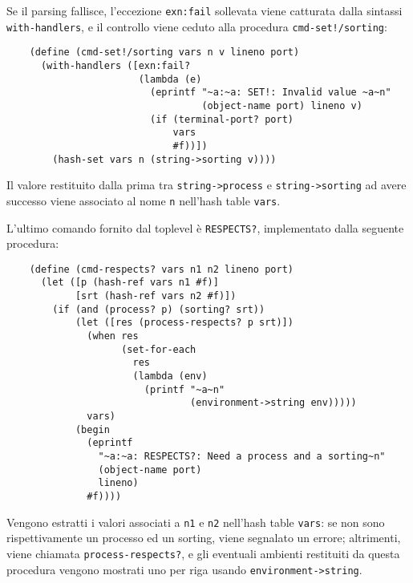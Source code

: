 Se il parsing fallisce, l'eccezione \lstinline{exn:fail} sollevata
viene catturata dalla sintassi \lstinline{with-handlers}, e il controllo
viene ceduto alla procedura \lstinline{cmd-set!/sorting}:

\begin{lstlisting}
    (define (cmd-set!/sorting vars n v lineno port)
      (with-handlers ([exn:fail?
                       (lambda (e)
                         (eprintf "~a:~a: SET!: Invalid value ~a~n"
                                  (object-name port) lineno v)
                         (if (terminal-port? port)
                             vars
                             #f))])
        (hash-set vars n (string->sorting v))))
\end{lstlisting}

Il valore restituito dalla prima tra \lstinline{string->process} e
\lstinline{string->sorting} ad avere successo viene associato al nome
\lstinline{n} nell'hash table \lstinline{vars}.

L'ultimo comando fornito dal toplevel \`e \lstinline{RESPECTS?},
implementato dalla seguente procedura:

\begin{lstlisting}
    (define (cmd-respects? vars n1 n2 lineno port)
      (let ([p (hash-ref vars n1 #f)]
            [srt (hash-ref vars n2 #f)])
        (if (and (process? p) (sorting? srt))
            (let ([res (process-respects? p srt)])
              (when res
                    (set-for-each
                      res
                      (lambda (env)
                        (printf "~a~n"
                                (environment->string env)))))
              vars)
            (begin
              (eprintf
                "~a:~a: RESPECTS?: Need a process and a sorting~n"
                (object-name port)
                lineno)
              #f))))
\end{lstlisting}

Vengono estratti i valori associati a \lstinline{n1} e \lstinline{n2}
nell'hash table \lstinline{vars}: se non sono rispettivamente un
processo ed un sorting, viene segnalato un errore; altrimenti, viene
chiamata \lstinline{process-respects?}, e gli eventuali ambienti
restituiti da questa procedura vengono mostrati uno per riga usando
\lstinline{environment->string}.
